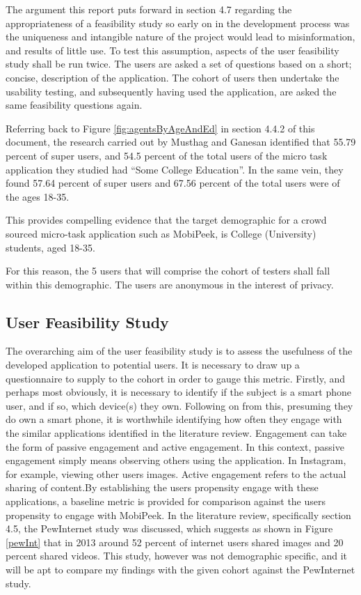 \documentclass[a4paper]{article}
\begin{document}
The argument this report puts forward in section 4.7 regarding the appropriateness of a feasibility study so early on in the development process was the uniqueness and intangible nature of the project would lead to misinformation, and results of little use. To test this assumption, aspects of the user feasibility study shall be run twice. The users are asked a set of questions based on a short; concise, description of the application. The cohort of users then undertake the usability testing, and subsequently having used the application, are asked the same feasibility questions again. 

Referring back to Figure \ref{fig:agentsByAgeAndEd} in section 4.4.2 of this document, the research carried out by Musthag and Ganesan identified that 55.79 percent of super users, and 54.5 percent of the total users of the micro task application they studied had ``Some College Education''. In the same vein, they found 57.64 percent of super users and 67.56 percent of the total users were of the ages 18-35.

This provides compelling evidence that the target demographic for a crowd sourced micro-task application such as MobiPeek, is College (University) students, aged 18-35.

For this reason, the 5 users that will comprise the cohort of testers shall fall within this demographic.
The users are anonymous in the interest of privacy.

\subsection{User Feasibility Study}
The overarching aim of the user feasibility study is to assess the usefulness of the developed application to potential users. It is necessary to draw up a questionnaire to supply to the cohort in order to gauge this metric.
Firstly, and perhaps most obviously, it is necessary to identify if the subject is a smart phone user, and if so, which device(s) they own. Following on from this, presuming they do own a smart phone, it is worthwhile identifying how often they engage with the similar applications identified in the literature review. Engagement can take the form of passive engagement and active engagement. In this context, passive engagement simply means observing others using the application. In Instagram, for example, viewing other users images. Active engagement refers to the actual sharing of content.By establishing the users propensity engage with these applications, a baseline metric is provided for comparison against the users propensity to engage with MobiPeek. In the literature review, specifically section 4.5, the PewInternet study was discussed, which suggests as shown in Figure \ref{pewInt} that in 2013 around 52 percent of internet users shared images and 20 percent shared videos. This study, however was not demographic specific, and it will be apt to compare my findings with the given cohort against the PewInternet study.
\end{document}
